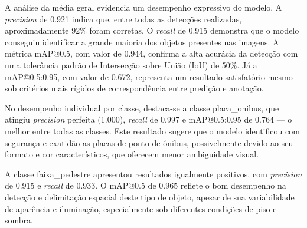 \begin{table}[htbp]
\centering
\caption{Métricas de desempenho do modelo \texttt{yolo11m.pt} (best.pt) no conjunto de validação}
\label{tab:metricas-yolov11m}
\end{table}

A análise da média geral evidencia um desempenho expressivo do modelo. A \textit{precision} de 0.921 indica que, entre todas as detecções realizadas, aproximadamente 92\% foram corretas. O \textit{recall} de 0.915 demonstra que o modelo conseguiu identificar a grande maioria dos objetos presentes nas imagens. A métrica mAP@0.5, com valor de 0.944, confirma a alta acurácia da detecção com uma tolerância padrão de Intersecção sobre União (IoU) de 50\%. Já a mAP@0.5:0.95, com valor de 0.672, representa um resultado satisfatório mesmo sob critérios mais rígidos de correspondência entre predição e anotação.

No desempenho individual por classe, destaca-se a classe placa\_onibus, que atingiu \textit{precision} perfeita (1.000), \textit{recall} de 0.997 e mAP@0.5:0.95 de 0.764 — o melhor entre todas as classes. Este resultado sugere que o modelo identificou com segurança e exatidão as placas de ponto de ônibus, possivelmente devido ao seu formato e cor característicos, que oferecem menor ambiguidade visual.

A classe faixa\_pedestre apresentou resultados igualmente positivos, com \textit{precision} de 0.915 e \textit{recall} de 0.933. O mAP@0.5 de 0.965 reflete o bom desempenho na detecção e delimitação espacial deste tipo de objeto, apesar de sua variabilidade de aparência e iluminação, especialmente sob diferentes condições de piso e sombra.

